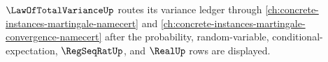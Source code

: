 $\LawOfTotalVarianceUp$ routes its variance ledger through \autoref{ch:concrete-instances-martingale-namecert} and \autoref{ch:concrete-instances-martingale-convergence-namecert} after the probability, random-variable, conditional-expectation, $\RegSeqRatUp$, and $\RealUp$ rows are displayed.



